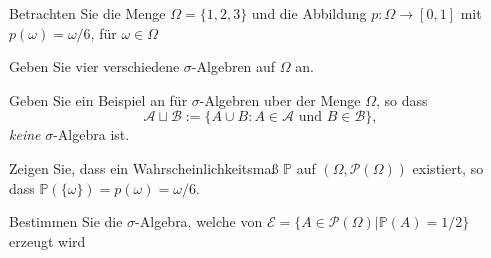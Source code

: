 \begin{Problem}
	Betrachten Sie die Menge $\Omega = \{1, 2, 3\}$ und die Abbildung $p : \Omega \to [0, 1]$ mit $p(\omega) = \omega/6$, f\"{u}r $\omega\in\Omega$
	\begin{parts}
		\item Geben Sie vier verschiedene $\sigma$-Algebren auf $\Omega$ an.
		\item Geben Sie ein Beispiel an f\"{u}r $\sigma$-Algebren uber der Menge $\Omega$, so dass
		\[\mathcal{A}\sqcup \mathcal{B}:=\{A\cup B:A\in\mathcal{A}\text{ und }B\in\mathcal{B}\},\]
		\emph{keine} $\sigma$-Algebra ist.
		\item Zeigen Sie, dass ein Wahrscheinlichkeitsmaß $\mathbb{P}$ auf $(\Omega,\mathcal{P}(\Omega))$ existiert, so dass $\mathbb{P}(\{\omega\}) =p(\omega)=\omega/6$.
		\item Bestimmen Sie die $\sigma$-Algebra, welche von $\mathcal{E} = \{A\in \mathcal{P}(\Omega)|\mathbb{P}(A) = 1/2\}$ erzeugt wird
	\end{parts}
	\end{Problem}
